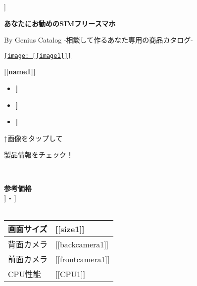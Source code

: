 \documentclass[lualatex,paper=a4,airticle]{jlreq}
\begin{document}
\begin{flushright}
  [[date]]
\end{flushright}
\begin{center}
  {\huge\textbf{あなたにお勧めのSIMフリースマホ}}\par
  By Genius Catalog  -相談して作るあなた専用の商品カタログ-
\end{center}
\noindent

\begin{minipage}[t][0.43\textheight][t]{\textwidth}
  \begin{minipage}{0.23\textwidth}
    \href{[[url1]]}{\texttt{[image: [[image1]]]}}
  \end{minipage}%
  \hfill
  \begin{minipage}{0.77\textwidth}
    \href{[[lurl1]]}{\huge{\textbf{[[name1]]}}}\par
    \begin{itemize}
      \item {\color{Purple}\mcfamily\bfseries\myfont [[description11]]}
      \item {\color{Purple}\mcfamily\bfseries\myfont [[description12]]}
      \item {\color{Purple}\mcfamily\bfseries\myfont [[description13]]}
    \end{itemize}
  \end{minipage}
  \vspace{-1\baselineskip}
  \begin{multicols}{2}
    \begin{spacing}{0.5}
      {\qquad↑画像をタップして \par \qquad 製品情報をチェック！}\\
    \end{spacing}
    {\color{red}\textbf{参考価格}}\\
    {\LARGE\color{red}\textbf{\textyen [[lprice1]] - \textyen [[hprice1]]}}\\
    \\
    \begin{minipage}{0.75\columnwidth}
      \begin{tabular}{l p{4.5cm}}
        \hline
        画面サイズ & [[size1]] \\
        \hline
        背面カメラ & [[backcamera1]] \\
        \hline
        前面カメラ & [[frontcamera1]] \\
        \hline
        CPU性能 & [[CPU1]] \\
        \hline
      \end{tabular}
    \end{minipage}
    \columnbreak


\end{multicols}
\end{minipage}
\end{document}
